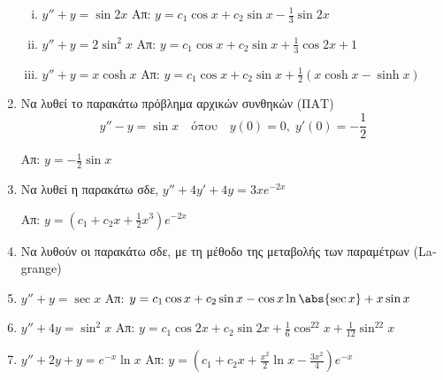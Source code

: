 \begin{enumerate}
\begin{enumerate}[i)]

\item $y''+y=\sin 2x$ \hfill Απ: $y=c_1\cos x+c_2\sin x-\frac{1}{3}\sin 2x$
\item $y''+y=2\sin^2 x$ \hfill Απ: $y=c_1\cos x+c_2\sin x+\frac{1}{3}\cos 2x+1$
\item $y''+y=x\cosh x$ \hfill Απ: $y=c_1\cos x+c_2\sin x +\frac{1}{2}(x\cosh x-\sinh x)$

\end{enumerate}

\item Να λυθεί το παρακάτω πρόβλημα αρχικών συνθηκών (ΠΑΤ) 
\[
y''-y=\sin x \quad \text{όπου}\quad y(0)=0,\; y'(0)=-\frac{1}{2}
\]

\hfill Απ: $y=-\frac{1}{2}\sin x$

\item Να λυθεί η παρακάτω σδε, $y''+4y'+4y=3xe^{-2x}$

\hfill Απ: $y=(c_1+c_2x+\frac{1}{2}x^3)e^{-2x}$

\item Να λυθούν οι παρακάτω σδε, με τη μέθοδο της μεταβολής των παραμέτρων (\textlatin{Lagrange})

\item $y''+y=\sec x$ \hfill Απ: $y=c_1\cos x+c_2\sin x - \cos x\ln\abs{\sec x}+x\sin x$
\item $y''+4y=\sin^2x$ \hfill Απ: $y=c_1\cos 2x+c_2\sin 2x+\frac{1}{6}\cos^22x+\frac{1}{12}\sin^22x$
\item $y''+2y+y=e^{-x}\ln x$ \hfill Απ: $y=(c_1+c_2x+\frac{x^2}{2}\ln x-\frac{3x^2}{4})e^{-x}$


\end{enumerate}




